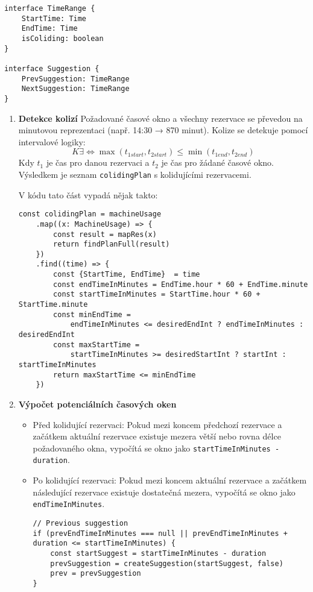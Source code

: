 \begin{lstlisting}
interface TimeRange {
    StartTime: Time
    EndTime: Time
    isColiding: boolean
}

interface Suggestion {
    PrevSuggestion: TimeRange
    NextSuggestion: TimeRange
}
\end{lstlisting}
\begin{enumerate}
    \item \textbf{Detekce kolizí}
	Požadované časové okno a všechny rezervace se převedou na minutovou reprezentaci (např. 14:30 → 870 minut). Kolize se detekuje pomocí intervalové logiky:
\[
K \exists \iff \max(t_{1start}, t_{2start}) \leq \min(t_{1end}, t_{2end})
\]
	Kdy \( t_{1} \) je čas pro danou rezervaci a \( t_{2} \) je čas pro žádané časové okno.
	Výsledkem je seznam \texttt{colidingPlan} s kolidujícími rezervacemi.
	
	V kódu tato část vypadá nějak takto:
	
    \begin{lstlisting}
const colidingPlan = machineUsage
	.map((x: MachineUsage) => {
	    const result = mapRes(x)
	    return findPlanFull(result)
	})
	.find((time) => {
	    const {StartTime, EndTime}  = time
	    const endTimeInMinutes = EndTime.hour * 60 + EndTime.minute
	    const startTimeInMinutes = StartTime.hour * 60 + StartTime.minute
	    const minEndTime =
		    endTimeInMinutes <= desiredEndInt ? endTimeInMinutes : desiredEndInt
	    const maxStartTime =
		    startTimeInMinutes >= desiredStartInt ? startInt : startTimeInMinutes
	    return maxStartTime <= minEndTime
	})
    \end{lstlisting}

    \item \textbf{Výpočet potenciálních časových oken}
    \begin{itemize}
    	\item Před kolidující rezervaci: Pokud mezi koncem předchozí rezervace a začátkem aktuální rezervace existuje mezera větší nebo rovna délce požadovaného okna, vypočítá se okno jako \texttt{startTimeInMinutes - duration}.
    	\item Po kolidující rezervaci: Pokud mezi koncem aktuální rezervace a začátkem následující rezervace existuje dostatečná mezera, vypočítá se okno jako \texttt{endTimeInMinutes}. 
	

    \begin{lstlisting}
// Previous suggestion
if (prevEndTimeInMinutes === null || prevEndTimeInMinutes + duration <= startTimeInMinutes) {
    const startSuggest = startTimeInMinutes - duration
    prevSuggestion = createSuggestion(startSuggest, false)
    prev = prevSuggestion
}


\end{lstlisting}
\end{itemize}
\end{enumerate}
